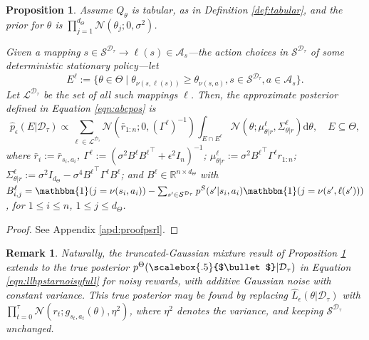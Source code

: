 \documentclass{amsart}
\newtheorem{proposition}{Proposition}
\newtheorem{remark}{Remark}
\renewcommand{\cdot}[1][.5]{%
  \mathbin{\vcenter{\hbox{\scalebox{#1}{$\bullet$}}}}%
}
\begin{document}
\begin{proposition}
\label{prop:psrl_new}
Assume $Q_\theta$  is tabular, as in Definition \ref{def:tabular}, and the prior for $\theta$ is $\prod_{j=1}^{d_\Theta}\mathcal{N}(\theta_j ; 0, \sigma^2)$.


Given a mapping $s \in \mathcal{S}^{\mathcal{D}_{\tau}}\rightarrow \ell(s)\in \mathcal{A}_s$---the action choices in $\mathcal{S}^{\mathcal{D}_{\tau}}$ of some deterministic stationary policy---let 
$$ E^\ell := \{\theta \in \Theta \mid \theta_{\nu(s,\ell(s))}\geq \theta_{\nu(s,a)}, s\in \mathcal{S}^{\mathcal{D}_{\tau}}, a \in \mathcal{A}_s\}.$$ 
Let $\mathcal{L}^{\mathcal{D}_{\tau}}$ be the set of all such mappings $\ell$. Then,
the approximate posterior defined in Equation \ref{eqn:abcpos} is
\begin{equation}\label{eqn:gaussianintegralformula}
\hat{p}_\epsilon ( E |\mathcal{D}_{\tau}) \propto
\sum\limits_{\ell \in \mathcal{L}^{\mathcal{D}_{\tau}}} \mathcal{N}(\bar{r}_{1:n};0,(\Gamma^{\ell})^{-1}) \int_{E\cap E^\ell} \mathcal{N}(\theta;\mu^\ell_{\theta|r},\Sigma^\ell_{\theta|r})\mathrm{d}\theta, \quad E \subseteq \Theta,\end{equation}
where $\bar{r}_{i}:= \bar{r}_{s_i,a_i}$, $\Gamma^{\ell} := (\sigma^2 B^\ell {B^\ell}^\top + \epsilon^2 I_n)^{-1}$; $\mu^\ell_{\theta|r} := \sigma^2 {B^\ell}^\top\Gamma^{\ell} r_{1:n}$; $\Sigma^\ell_{\theta|r}:= \sigma^2 I_{d_{\Theta}} - \sigma^4 {B^\ell}^\top \Gamma^{\ell} B^\ell$; and $B^\ell \in \mathbb{R}^{n\times d_{\Theta}}$ with $B^\ell_{i,j} = \mathbbm{1}(j=\nu(s_i,a_i)) - \sum_{s^\prime \in \mathcal{S}^{\mathcal{D}_{\tau}}} p^S(s^\prime|s_i,a_i) \mathbbm{1}(j=\nu(s^\prime,\ell(s^\prime)))$, for $1\leq i \leq n$, $1\leq j \leq d_{\Theta}$.
\end{proposition}
\begin{proof}
See Appendix \ref{apd:proofpsrl}.
\end{proof}

\begin{remark}\label{rmk:psrl_extension}
Naturally, the truncated-Gaussian mixture result of Proposition \ref{prop:psrl_new} extends to the true posterior $p^\Theta(\cdot |\mathcal{D}_{\tau})$ in Equation \ref{eqn:llhpstarnoisyfull} for noisy rewards, with additive Gaussian noise with constant variance. This true posterior may be found by replacing $\hat{L}_\epsilon(\theta|\mathcal{D}_\tau)$ with $\prod_{t=0}^\tau\mathcal{N}(r_t;g_{s_t,a_t}(\theta),\eta^2)$, where $\eta^2$ denotes the variance, and keeping $\mathcal{S}^{\mathcal{D}_\tau}$ unchanged.
 \end{remark}
\end{document}
